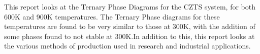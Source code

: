 This report looks at the Ternary Phase Diagrams for the CZTS system, for both 600K and 900K temperatures. The Ternary Phase diagrams for these temperatures are found to be very similar to those at 300K, with the addition of some phases found to not stable at 300K.In addition to this, this report looks at the various methods of production used in research and industrial applications.